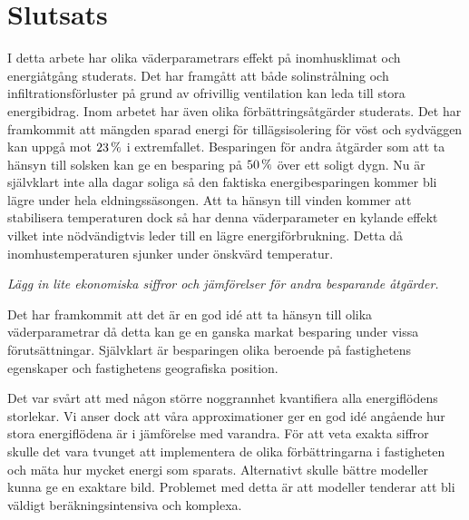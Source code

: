 \chapter{Slutsats}


I detta arbete har olika väderparametrars effekt på inomhusklimat och energiåtgång studerats.
Det har framgått att både solinstrålning och infiltrationsförluster på grund av ofrivillig
ventilation kan leda till stora energibidrag. Inom arbetet har även olika förbättringsåtgärder
studerats. Det har framkommit att mängden sparad energi för tillägsisolering för vöst och sydväggen
kan uppgå mot $\unit[23]{\%}$ i extremfallet. Besparingen för andra åtgärder som att ta hänsyn till solsken
kan ge en besparing på $\unit[50]{\%}$ över ett soligt dygn.  Nu är självklart inte alla dagar soliga
så den faktiska energibesparingen kommer bli lägre under hela eldningssäsongen.
Att ta hänsyn till vinden kommer att stabilisera
temperaturen dock så har denna väderparameter en kylande effekt vilket inte nödvändigtvis leder
till en lägre energiförbrukning. Detta då inomhustemperaturen sjunker under önskvärd temperatur. 

\emph{\color{red} Lägg in lite ekonomiska siffror och jämförelser för andra besparande åtgärder.}

Det har framkommit att det är en god idé att ta hänsyn till olika väderparametrar då
detta kan ge en ganska markat besparing under vissa förutsättningar. Självklart är
besparingen olika beroende på fastighetens egenskaper och fastighetens geografiska position.

Det var svårt att med någon större noggrannhet kvantifiera alla energiflödens storlekar. Vi
anser dock att våra approximationer ger en god idé angående hur stora energiflödena är i jämförelse
med varandra. För att veta exakta siffror skulle det vara tvunget att implementera de olika
förbättringarna i fastigheten och mäta hur mycket energi som sparats. Alternativt skulle
bättre modeller kunna ge en exaktare bild. Problemet med detta är att modeller tenderar att
bli väldigt beräkningsintensiva och komplexa.

